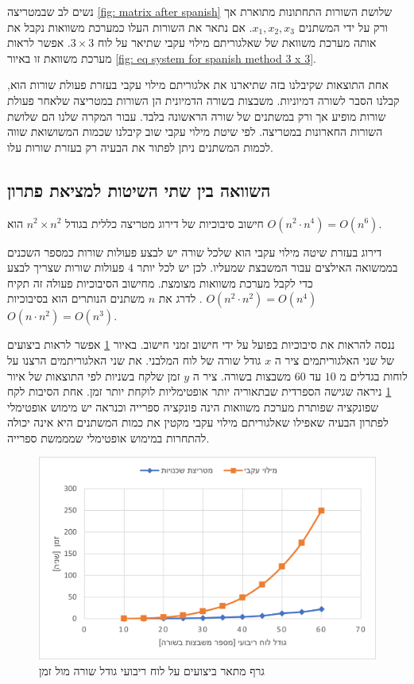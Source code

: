 \documentclass[12pt,leqno]{article}
\theoremstyle{theoremdd}
\begin{document}
נשים לב שבמטריצה 
\ref{fig: matrix after spanish}
שלושת השורות התחתונות מתוארת אך ורק על 
ידי 
המשתנים 
$x_1, x_2, x_3$.
אם נתאר את השורות העלו כמערכת משוואות נקבל
את אותה מערכת משוואת של 
שאלגוריתם מילוי עקבי שתיאר על לוח 
$3 \times 3$.
אפשר לראות מערכת משוואת זו באיור 
\ref{fig: eq system for spanish method 3 x 3}.

אחת התוצאות שקיבלנו בזה שתיארנו את אלגוריתם מילוי עקבי 
בעזרת פעולת שורות הוא, קבלנו הסבר לשורה דמיוניות.
משבצות בשורה הדמיונית 
הן השורות במטריצה
שלאחר פעולת שורות 
מופיע אך ורק במשתנים של שורה הראשונה בלבד.
עבור המקרה שלנו הם שלושת השורות החארונות במטריצה.
לפי שיטת מילוי עקבי שוב קיבלנו שכמות המשושואת שווה 
לכמות המשתנים ניתן לפתור את הבעיה 
רק בעזרת שורות עלו.

\subsection{השוואה בין שתי השיטות למציאת פתרון}
חישוב סיבוכיות
של דירוג מטריצה 
כללית
בגודל 
$n^2 \times n^2$
הוא 
$O(n^2 \cdot n^4) = O(n^6)$.

דירוג בעזרת שיטה מילוי עקבי הוא שלכל שורה 
יש לבצע פעולות שורות כמספר השכנים בממשואה האילצים
עבור המשבצת שמעליו.
לכן יש לכל יותר
$4$
פעולות שורות שצריך לבצע
כדי לקבל מערכת משוואות מצומצת.
מחישוב הסיבוכיות 
פעולה  זה תקיח
$O(n^2 \cdot n^2) = O(n^4)$
.
לדרג את
$n$
משתנים  
הנותרים
הוא בסיבוכיות 
$O(n \cdot n^2) = O (n^3)$.

ננסה להראות את סיבוכיות בפועל על ידי חישוב זמני חישוב.
באיור 
\ref{fig:prefofmance_diagram}
אפשר לראות ביצועים
של שני האלגוריתמים ציר 
ה
$x$
גודל שורה של לוח המלבני.
את שני האלגוריתמים
הרצנו על 
לוחות בגדלים 
מ
$10$
עד 
$60$
משבצות
בשורה.
ציר ה
$y$
זמן שלקח 
בשניות
לפי התוצאות של איור 
\ref{fig:prefofmance_diagram}
ניראה 
שגישה הספרדית שבתאוריה יותר אופטימליות לוקחת יותר זמן.
אחת הסיבות לקח 
שפונקציה שפותרת מערכת משוואות הינה פונקציה ספרייה
וכנראה יש מימוש אופטימלי לפתרון הבעיה שאפילו 
שאלגוריתם מילוי עקבי מקטין את כמות 
המשתנים היא אינה יכולה להתחרות במימוש אופטימלי שמממשת ספרייה.

\begin{figure}[ht]
    \caption{ 
    גרף מתאר ביצועים על לוח ריבועי גודל שורה מול זמן
    }
    \label{fig:prefofmance_diagram}
    \centering
    \includegraphics{images/benchmark.png}
\end{figure}
\end{document}
